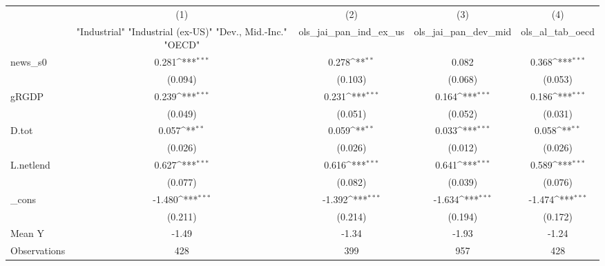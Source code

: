 {
\def\sym#1{\ifmmode^{#1}\else\(^{#1}\)\fi}
\begin{tabular}{l*{4}{c}}
\toprule
            &\multicolumn{1}{c}{(1)}&\multicolumn{1}{c}{(2)}&\multicolumn{1}{c}{(3)}&\multicolumn{1}{c}{(4)}\\
            &\multicolumn{1}{c}{ "Industrial" "Industrial (ex-US)" "Dev., Mid.-Inc." "OECD" }&\multicolumn{1}{c}{ols\_jai\_pan\_ind\_ex\_us}&\multicolumn{1}{c}{ols\_jai\_pan\_dev\_mid}&\multicolumn{1}{c}{ols\_al\_tab\_oecd}\\
\midrule
news\_s0     &       0.281\sym{***}&       0.278\sym{**} &       0.082         &       0.368\sym{***}\\
            &     (0.094)         &     (0.103)         &     (0.068)         &     (0.053)         \\
\addlinespace
gRGDP       &       0.239\sym{***}&       0.231\sym{***}&       0.164\sym{***}&       0.186\sym{***}\\
            &     (0.049)         &     (0.051)         &     (0.052)         &     (0.031)         \\
\addlinespace
D.tot       &       0.057\sym{**} &       0.059\sym{**} &       0.033\sym{***}&       0.058\sym{**} \\
            &     (0.026)         &     (0.026)         &     (0.012)         &     (0.026)         \\
\addlinespace
L.netlend   &       0.627\sym{***}&       0.616\sym{***}&       0.641\sym{***}&       0.589\sym{***}\\
            &     (0.077)         &     (0.082)         &     (0.039)         &     (0.076)         \\
\addlinespace
\_cons      &      -1.480\sym{***}&      -1.392\sym{***}&      -1.634\sym{***}&      -1.474\sym{***}\\
            &     (0.211)         &     (0.214)         &     (0.194)         &     (0.172)         \\
\midrule
Mean Y      &       -1.49         &       -1.34         &       -1.93         &       -1.24         \\
Observations&         428         &         399         &         957         &         428         \\
\bottomrule
\end{tabular}
}
